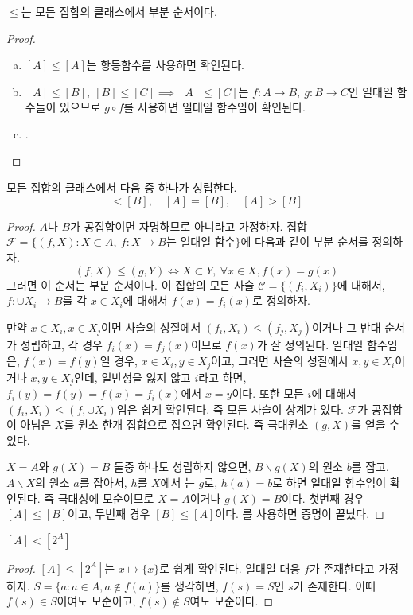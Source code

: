 \begin{theorem}
	$\leq$는 모든 집합의 클래스에서 부분 순서이다.
\end{theorem}
\begin{proof}
	\begin{enumerate}[(a)]
		\item $[A] \leq [A]$는 항등함수를 사용하면 확인된다.
		\item $[A] \leq [B],\:[B] \leq [C] \implies [A] \leq [C]$는 $f : A \to B,\: g : B \to C$인 일대일 함수들이 있으므로
		$g \circ f$를 사용하면 일대일 함수임이 확인된다.
		\item {}.
	\end{enumerate}
\end{proof}
\begin{theorem}
	모든 집합의 클래스에서 다음 중 하나가 성립한다.
	\begin{equation}
		[A] < [B], \quad [A] = [B], \quad [A] > [B]
	\end{equation}
\end{theorem}
\begin{proof}
	$A$나 $B$가 공집합이면 자명하므로 아니라고 가정하자.
	집합 $\mathscr{F} = \{(f, X) : X \subset A,\: f : X \to B \text{는 일대일 함수}\}$에 다음과 같이 부분 순서를 정의하자.
	\begin{equation}
		(f, X) \leq (g, Y) \iff X \subset Y,\: \forall x \in X, f(x) = g(x)
	\end{equation}
	그러면 이 순서는 부분 순서이다.
	이 집합의 모든 사슬 $\mathscr{C} = \{(f_i, X_i)\}$에 대해서, $f : \cup X_i \to B$를 각 $x \in X_i$에 대해서 $f(x) = f_i(x)$로 정의하자.

	만약 $x \in X_i, x \in X_j$이면 사슬의 성질에서 $(f_i, X_i) \leq (f_j, X_j)$이거나 그 반대 순서가 성립하고,
	각 경우 $f_i(x) = f_j(x)$이므로 $f(x)$가 잘 정의된다.
	일대일 함수임은, $f(x) = f(y)$일 경우, $x \in X_i, y \in X_j$이고, 그러면 사슬의 성질에서 $x, y \in X_i$이거나 $x, y \in X_j$인데, 일반성을 잃지 않고 
	$i$라고 하면, $f_i(y) = f(y) = f(x) = f_i(x)$에서 $x = y$이다.
	또한 모든 $i$에 대해서 $(f_i, X_i) \leq (f, \cup X_i)$임은 쉽게 확인된다.
	즉 모든 사슬이 상계가 있다.
	$\mathscr{F}$가 공집합이 아님은 $X$를 원소 한개 집합으로 잡으면 확인된다.
	즉 극대원소 $(g, X)$를 얻을 수 있다.

	$X = A$와 $g(X) = B$ 둘중 하나도 성립하지 않으면, $B \backslash g(X)$의 원소 $b$를 잡고, $A \backslash X$의 원소 $a$를 잡아서,
	$h$를 $X$에서 는 $g$로, $h(a) = b$로 하면
	일대일 함수임이 확인된다.
	즉 극대성에 모순이므로 $X = A$이거나 $g(X) = B$이다.
	첫번째 경우 $[A] \leq [B]$이고, 두번째 경우 $[B] \leq [A]$이다.
	를 사용하면 증명이 끝났다.
\end{proof}
\begin{theorem}[Cantor]
	$[A] < [2^A]$
\end{theorem}
\begin{proof}
	$[A] \leq [2^A]$는 $x \mapsto \{x\}$로 쉽게 확인된다.
	일대일 대응 $f$가 존재한다고 가정하자.
	$S = \{a : a \in A, a \not\in f(a) \}$를 생각하면, $f(s) = S$인 $s$가 존재한다.
	이때 $f(s) \in S$이여도 모순이고, $f(s) \not\in S$여도 모순이다.
\end{proof}
